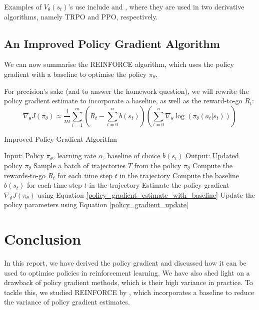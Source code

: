 \documentclass{article} %
\begin{document}
Examples of $V_\theta(s_t)$'s use include \cite{Schulman-et-al-2015} and \cite{Schulman-et-al-2017}, where they are used in two derivative algorithms, namely TRPO and PPO, respectively.

\subsection{An Improved Policy Gradient Algorithm}
We can now summarise the REINFORCE algorithm, which uses the policy gradient with a baseline to optimise the policy $\pi_\theta$.

For precision's sake (and to answer the homework question), we will rewrite the policy gradient estimate to incorporate a baseline, as well as the reward-to-go $R_t$:
\begin{equation} \label{policy_gradient_estimate_with_baseline}
    \nabla_\theta J(\pi_\theta) \approx \frac{1}{m} \sum_{i=1}^{m} \left(R_t - \sum_{t=0}^{n} b(s_t)\right) \left( \sum_{t=0}^{n} \nabla_\theta \log(\pi_\theta(a_t | s_t)) \right)
\end{equation}

\begin{algorithm}[H]
    \caption{Improved Policy Gradient Algorithm}
    \label{alg:reinforce}
    \begin{algorithmic}[1]
        \State Input: Policy $\pi_\theta$, learning rate $\alpha$, baseline of choice $b(s_t)$
        \State Output: Updated policy $\pi_\theta$
            \State Sample a batch of trajectories $T$ from the policy $\pi_\theta$
                \State Compute the rewards-to-go $R_t$ for each time step $t$ in the trajectory
                \State Compute the baseline $b(s_t)$ for each time step $t$ in the trajectory
                \State Estimate the policy gradient $\nabla_\theta J(\pi_\theta)$ using Equation \eqref{policy_gradient_estimate_with_baseline}
            \EndFor
            \State Update the policy parameters using Equation \eqref{policy_gradient_update}
        \EndWhile
    \end{algorithmic}
\end{algorithm}

\section{Conclusion}
In this report, we have derived the policy gradient and discussed how it can be used to optimise policies in reinforcement learning.
We have also shed light on a drawback of policy gradient methods, which is their high variance in practice.
To tackle this, we studied REINFORCE by \cite{Williams-1992}, which incorporates a baseline to reduce the variance of policy gradient estimates.
\end{document}
